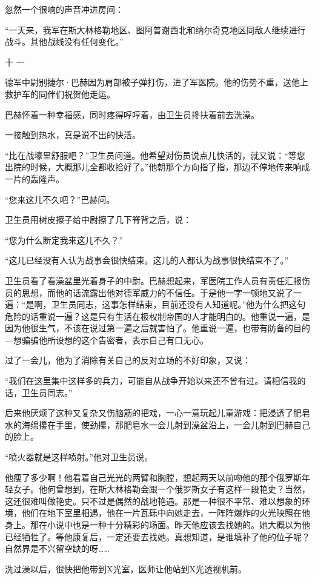忽然一个很响的声音冲进房间：

“一天来，我军在斯大林格勒地区、图阿普谢西北和纳尔奇克地区同敌人继续进行战斗。其他战线没有任何变化。”

十 一

德军中尉别捷尔·巴赫因为肩部被子弹打伤，进了军医院。他的伤势不重，送他上救护车的同伴们祝贺他走运。

巴赫怀着一种幸福感，同时疼得哼哼着，由卫生员搀扶着前去洗澡。

一接触到热水，真是说不出的快活。

“比在战壕里舒服吧？”卫生员问道。他希望对伤员说点儿快活的，就又说：“等您出院的时候，大概那儿全都收拾好了。”他朝那个方向指了指，那边不停地传来响成一片的轰隆声。

“您来这儿不久吧？”巴赫问。

卫生员用树皮擦子给中尉擦了几下脊背之后，说：

“您为什么断定我来这儿不久？”

“这儿已经没有人认为战事会很快结束。这儿的人都认为战事很快结束不了。”

卫生员看了看澡盆里光着身子的中尉。巴赫想起来，军医院工作人员有责任汇报伤员的思想，而他的话流露出他对德军威力的不信任。于是他一字一顿地又说了一遍：“是啊，卫生员同志，这事怎样结束，目前还没有人知道呢。”他为什么把这句危险的话重说一遍？这是只有生活在极权制帝国的人才能明白的。他重说一遍，是因为他很生气，不该在说过第一遍之后就害怕了。他重说一遍，也带有防备的目的—想骗骗他所设想的这个告密者，表示自己有口无心。

过了一会儿，他为了消除有关自己的反对立场的不好印象，又说：

“我们在这里集中这样多的兵力，可能自从战争开始以来还不曾有过。请相信我的话，卫生员同志。”

后来他厌烦了这种又复杂又伤脑筋的把戏，一心一意玩起儿童游戏：把浸透了肥皂水的海绵攥在手里，使劲攥，那肥皂水一会儿射到澡盆沿上，一会儿射到巴赫自己的脸上。

“喷火器就是这样喷射。”他对卫生员说。

他痩了多少啊！他看着自己光光的两臂和胸膛，想起两天以前吻他的那个俄罗斯年轻女子。他何曾想到，在斯大林格勒会跟一个俄罗斯女子有这样一段艳史？当然，这还很难叫做艳史。只不过是偶然的战地艳遇。那是一种很不平常、难以想象的环境，他们在地下室里相遇，他在一片瓦砾中向她走去，一阵阵爆炸的火光映照在他身上。那在小说中也是一种十分精彩的场面。昨天他应该去找她的。她大概以为他已经牺牲了。等他康复后，一定还要去找她。真想知道，是谁填补了他的位子呢？自然界是不兴留空缺的呀……

洗过澡以后，很快把他带到X光室，医师让他站到X光透视机前。

